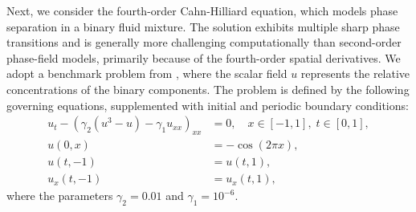 \documentclass[oneside,reqno,11pt,a4paper]{amsart}
\theoremstyle{definition}
\begin{document}
Next, we consider the fourth-order Cahn-Hilliard equation, which models phase
separation in a binary fluid mixture. The solution exhibits multiple sharp
phase transitions and is generally more challenging computationally than
second-order phase-field models, primarily because of the fourth-order spatial
derivatives. We adopt a benchmark problem from
\cite{Wight2021AdaptiveCH}, where the
scalar field $u$ represents the relative concentrations of the binary
components. The problem is defined by the following governing equations,
supplemented with initial and periodic boundary conditions:
\begin{align} \label{eq:cahn-hilliard-problem}
u_t - (\gamma_2(u^3 - u) - \gamma_1 u_{xx})_{xx} &= 0, \quad x \in [-1,1], \; t \in [0,1],\\
u(0,x) &= - \cos(2\pi x), \\
u(t,-1) &= u(t,1), \\
u_x(t,-1) &= u_x(t,1),
\end{align}
where the parameters $\gamma_2 = 0.01$ and $\gamma_1 = 10^{-6}$.
\end{document}
